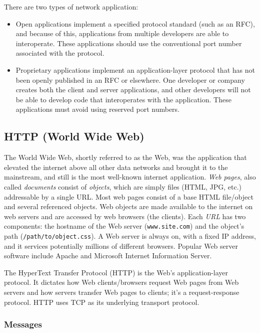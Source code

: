 \documentclass[8pt, table, xcdraw]{article}%
\begin{document}
There are two types of network application:

\begin{itemize}
 \item Open applications implement a specified protocol standard (such as an RFC), and because of this, applications from multiple developers are able to interoperate. These applications should use the conventional port number associated with the protocol.
 \item Proprietary applications implement an application-layer protocol that has not been openly published in an RFC or elsewhere. One developer or company creates both the client and server applications, and other developers will not be able to develop code that interoperates with the application. These applications must avoid using reserved port numbers.
\end{itemize}

\subsection{HTTP (World Wide Web)} \label{HTTP}

The World Wide Web, shortly referred to as the Web, was the application that elevated the internet above all other data networks and brought it to the mainstream, and still is the most well-known internet application. \emph{Web pages}, also called \emph{documents} consist of \emph{objects}, which are simply files (HTML, JPG, etc.) addressable by a single URL. Most web pages consist of a base HTML file/object and several referenced objects. Web objects are made available to the internet on web servers and are accessed by web browsers (the clients). Each \emph{URL} has two components: the hostname of the Web server (\texttt{www.site.com}) and the object’s path (\texttt{/path/to/object.css}). A Web server is always on, with a fixed IP address, and it services potentially millions of different browsers. Popular Web server software include Apache and Microsoft Internet Information Server.

The HyperText Transfer Protocol (HTTP) is the Web’s application-layer protocol. It dictates how Web clients/browsers request Web pages from Web servers and how servers transfer Web pages to clients; it's a request-response protocol. HTTP uses TCP as its underlying transport protocol.

\subsubsection{Messages}
\end{document}
